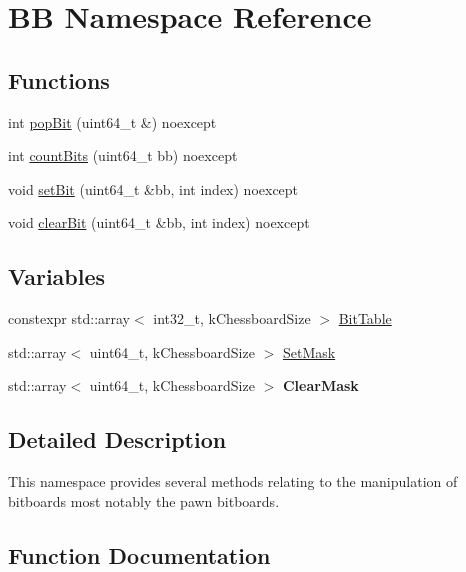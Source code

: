 \hypertarget{namespaceBB}{}\section{BB Namespace Reference}
\label{namespaceBB}
\subsection*{Functions}
\begin{DoxyCompactItemize}
\item 
int \mbox{\hyperlink{namespaceBB_a947400d855a9c4b3e62433637ec18f4b}{pop\+Bit}} (uint64\+\_\+t \&) noexcept
\item 
int \mbox{\hyperlink{namespaceBB_ae9ac6d5ba9f117b648a13a99374e13b9}{count\+Bits}} (uint64\+\_\+t bb) noexcept
\item 
void \mbox{\hyperlink{namespaceBB_aaf574afbd59d42b7ffc4acc32837d2f4}{set\+Bit}} (uint64\+\_\+t \&bb, int index) noexcept
\item 
void \mbox{\hyperlink{namespaceBB_a0b7cfd66f113184ea3448d59e18e1a8b}{clear\+Bit}} (uint64\+\_\+t \&bb, int index) noexcept
\end{DoxyCompactItemize}
\subsection*{Variables}
\begin{DoxyCompactItemize}
\item 
constexpr std\+::array$<$ int32\+\_\+t, k\+Chessboard\+Size $>$ \mbox{\hyperlink{namespaceBB_a0acc37f2676f5477b3ae05b694d6de80}{Bit\+Table}}
\item 
std\+::array$<$ uint64\+\_\+t, k\+Chessboard\+Size $>$ \mbox{\hyperlink{namespaceBB_a10499bbea66c7e9162798c25c7f956e1}{Set\+Mask}}
\item 
\mbox{\label{namespaceBB_a99ec7f28c784ee9a728d3269c24f1ce3}} 
std\+::array$<$ uint64\+\_\+t, k\+Chessboard\+Size $>$ {\bfseries Clear\+Mask}
\end{DoxyCompactItemize}


\subsection{Detailed Description}
This namespace provides several methods relating to the manipulation of bitboards most notably the pawn bitboards. 

\subsection{Function Documentation}
\mbox{\label{namespaceBB_a0b7cfd66f113184ea3448d59e18e1a8b}} 
